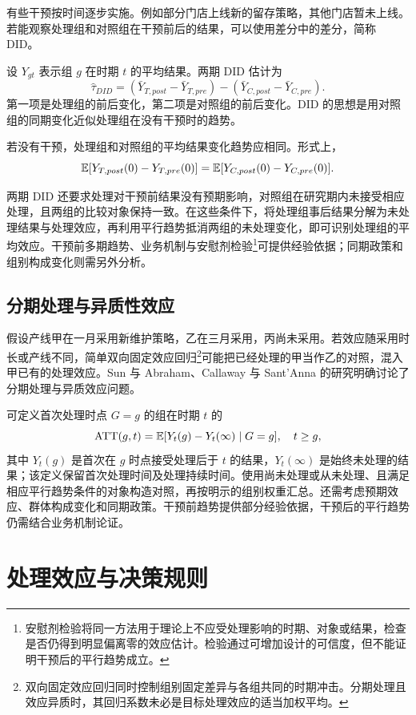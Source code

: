 有些干预按时间逐步实施。例如部分门店上线新的留存策略，其他门店暂未上线。若能观察处理组和对照组在干预前后的结果，可以使用差分中的差分，简称 DID。

设 \(Y_{gt}\) 表示组 \(g\) 在时期 \(t\) 的平均结果。两期 DID 估计为
\[
  \widehat{\tau}_{DID}
  =
  (\bar Y_{T,post}-\bar Y_{T,pre})
  -
  (\bar Y_{C,post}-\bar Y_{C,pre}).
\]
第一项是处理组的前后变化，第二项是对照组的前后变化。DID 的思想是用对照组的同期变化近似处理组在没有干预时的趋势。

\begin{definition}[平行趋势假设]
若没有干预，处理组和对照组的平均结果变化趋势应相同。形式上，
\[
  \mathbb E[Y_{T,post}(0)-Y_{T,pre}(0)]
  =
  \mathbb E[Y_{C,post}(0)-Y_{C,pre}(0)].
\]
\end{definition}

两期 DID 还要求处理对干预前结果没有预期影响，对照组在研究期内未接受相应处理，且两组的比较对象保持一致。在这些条件下，将处理组事后结果分解为未处理结果与处理效应，再利用平行趋势抵消两组的未处理变化，即可识别处理组的平均效应。干预前多期趋势、业务机制与安慰剂检验\footnote{安慰剂检验将同一方法用于理论上不应受处理影响的时期、对象或结果，检查是否仍得到明显偏离零的效应估计。检验通过可增加设计的可信度，但不能证明干预后的平行趋势成立。}可提供经验依据；同期政策和组别构成变化则需另外分析。

\subsection{分期处理与异质性效应}
假设产线甲在一月采用新维护策略，乙在三月采用，丙尚未采用。若效应随采用时长或产线不同，简单双向固定效应回归\footnote{双向固定效应回归同时控制组别固定差异与各组共同的时期冲击。分期处理且效应异质时，其回归系数未必是目标处理效应的适当加权平均。}可能把已经处理的甲当作乙的对照，混入甲已有的处理效应。Sun 与 Abraham、Callaway 与 Sant'Anna 的研究明确讨论了分期处理与异质效应问题\cite{sun08,csdid08}。

可定义首次处理时点 \(G=g\) 的组在时期 \(t\) 的
\[
\operatorname{ATT}(g,t)=\mathbb E[Y_t(g)-Y_t(\infty)\mid G=g],\quad t\ge g,
\]
其中 \(Y_t(g)\) 是首次在 \(g\) 时点接受处理后于 \(t\) 的结果，\(Y_t(\infty)\) 是始终未处理的结果；该定义保留首次处理时间及处理持续时间。使用尚未处理或从未处理、且满足相应平行趋势条件的对象构造对照，再按明示的组别权重汇总。还需考虑预期效应、群体构成变化和同期政策。干预前趋势提供部分经验依据，干预后的平行趋势仍需结合业务机制论证。

\section{处理效应与决策规则}

